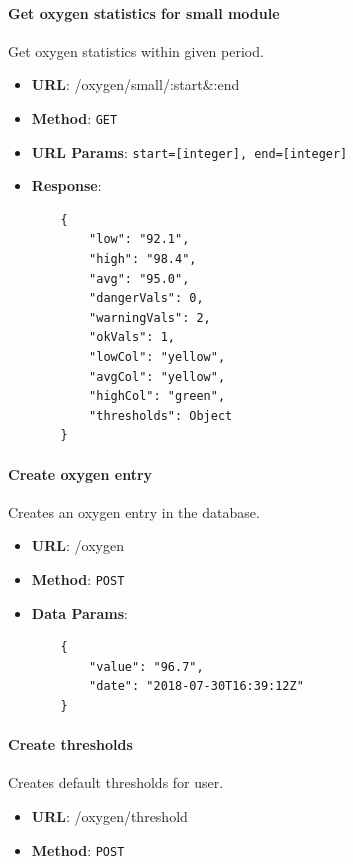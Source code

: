         \paragraph{Get oxygen statistics for small module} Get oxygen statistics within given period.
        \begin{itemize}
            \item \textbf{URL}: /oxygen/small/:start\&:end
            \item \textbf{Method}: \texttt{GET}
            \item \textbf{URL Params}: \texttt{start=[integer], end=[integer]}
            \item \textbf{Response}: \begin{verbatim}
    {
        "low": "92.1",
        "high": "98.4",
        "avg": "95.0",
        "dangerVals": 0,
        "warningVals": 2,
        "okVals": 1,
        "lowCol": "yellow",
        "avgCol": "yellow",
        "highCol": "green",
        "thresholds": Object
    }
            \end{verbatim}
        \end{itemize}

        \paragraph{Create oxygen entry} Creates an oxygen entry in the database.
        \begin{itemize}
            \item \textbf{URL}: /oxygen
            \item \textbf{Method}: \texttt{POST}
            \item \textbf{Data Params}: \begin{verbatim}
    {
        "value": "96.7",
        "date": "2018-07-30T16:39:12Z"
    }   
            \end{verbatim}
        \end{itemize}

        \paragraph{Create thresholds} Creates default thresholds for user.
        \begin{itemize}
            \item \textbf{URL}: /oxygen/threshold
            \item \textbf{Method}: \texttt{POST}
        \end{itemize}

